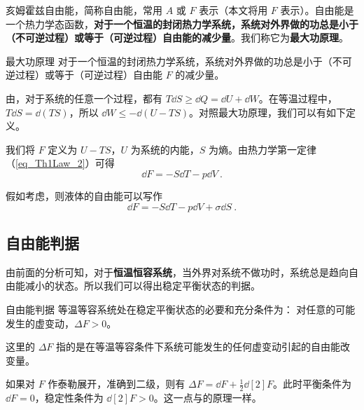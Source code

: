 

亥姆霍兹自由能，简称自由能，常用 $A$ 或 $F$ 表示（本文将用 $F$ 表示）。自由能是一个热力学态函数，\textbf{对于一个恒温的封闭热力学系统，系统对外界做的功总是小于（不可逆过程）或等于（可逆过程）自由能的减少量}。我们称它为\textbf{最大功原理}。
\begin{theorem}{最大功原理}
对于一个恒温的封闭热力学系统，系统对外界做的功总是小于（不可逆过程）或等于（可逆过程）自由能 $F$ 的减少量。
\end{theorem}

由，对于系统的任意一个过程，都有 $T\dd S\ge \dd Q=\dd U+\dd W$。在等温过程中，$T\dd S=\dd (TS)$，所以 $\dd W\le - \dd (U-TS)$。对照最大功原理，我们可以有如下定义。

我们将 $F$ 定义为 $U-TS$，$U$ 为系统的内能，$S$ 为熵。由热力学第一定律（\autoref{eq_Th1Law_2}）可得
\begin{equation}
\dd F=-S\dd T-p\dd V~.
\end{equation}

假如考虑，则液体的自由能可以写作
\begin{equation}
\dd F=-S\dd T-p \dd V+\sigma \dd S~.
\end{equation}
\subsection{自由能判据}
由前面的分析可知，对于\textbf{恒温恒容系统}，当外界对系统不做功时，系统总是趋向自由能减小的状态。所以我们可以得出稳定平衡状态的判据。

\begin{theorem}{自由能判据}
等温等容系统处在稳定平衡状态的必要和充分条件为：
对任意的可能发生的虚变动，$\Delta F>0$。

这里的 $\Delta F$ 指的是在等温等容条件下系统可能发生的任何虚变动引起的自由能改变量。

\end{theorem}

如果对 $F$ 作泰勒展开，准确到二级，则有 $\Delta F=\dd F+\frac{1}{2}\dd[2]{F}$。此时平衡条件为 $\dd F=0$，稳定性条件为 $\dd[2]{F}>0$。这一点与的原理一样。
